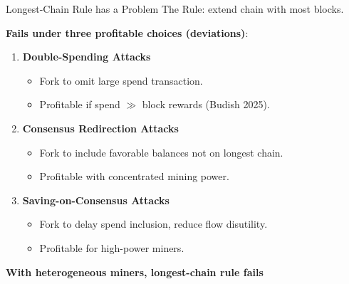 \documentclass[aspectratio=169, 12pt]{beamer}
\begin{document}
\begin{frame}{Longest-Chain Rule has a Problem}
    The Rule: extend chain with most blocks.
    
    \vspace{0.3cm}
    \textbf{Fails under three profitable choices (deviations)}:
    \begin{enumerate}
        \item \textbf{Double-Spending Attacks}
        \begin{itemize}
            \item Fork to omit large spend transaction.
            \item Profitable if spend \(\gg\) block rewards (Budish 2025).
        \end{itemize}
        \item \textbf{Consensus Redirection Attacks}
        \begin{itemize}
            \item Fork to include favorable balances not on longest chain.
            \item Profitable with concentrated mining power.
        \end{itemize}
        \item \textbf{Saving-on-Consensus Attacks}
        \begin{itemize}
            \item Fork to delay spend inclusion, reduce flow disutility.
            \item Profitable for high-power miners.
        \end{itemize}
    \end{enumerate}
    
  \textbf{  \alert{With heterogeneous miners, longest-chain rule fails}}
\end{frame}
\end{document}
